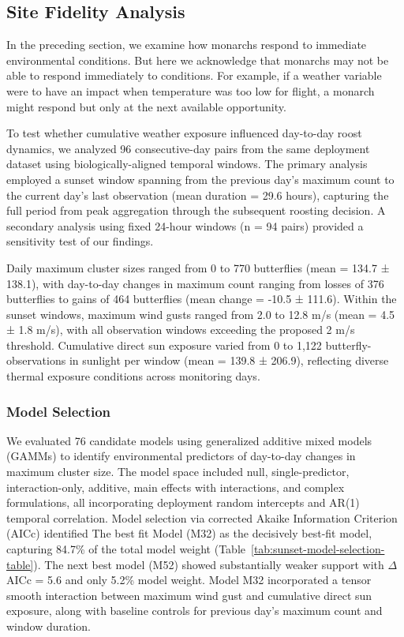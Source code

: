 

\subsection{Site Fidelity Analysis}

In the preceding section, we examine how monarchs respond to immediate environmental conditions. But here we acknowledge that monarchs may not be able to respond immediately to conditions. For example, if a weather variable were to have an impact when temperature was too low for flight, a monarch might respond but only at the next available opportunity.

To test whether cumulative weather exposure influenced day-to-day roost dynamics, we analyzed 96 consecutive-day pairs from the same deployment dataset using biologically-aligned temporal windows. The primary analysis employed a sunset window spanning from the previous day's maximum count to the current day's last observation (mean duration = 29.6 hours), capturing the full period from peak aggregation through the subsequent roosting decision. A secondary analysis using fixed 24-hour windows (n = 94 pairs) provided a sensitivity test of our findings.

Daily maximum cluster sizes ranged from 0 to 770 butterflies (mean = 134.7 ± 138.1), with day-to-day changes in maximum count ranging from losses of 376 butterflies to gains of 464 butterflies (mean change = -10.5 ± 111.6). Within the sunset windows, maximum wind gusts ranged from 2.0 to 12.8 m/s (mean = 4.5 ± 1.8 m/s), with all observation windows exceeding the proposed 2 m/s threshold. Cumulative direct sun exposure varied from 0 to 1,122 butterfly-observations in sunlight per window (mean = 139.8 ± 206.9), reflecting diverse thermal exposure conditions across monitoring days.

\subsubsection{Model Selection}

We evaluated 76 candidate models using generalized additive mixed models (GAMMs) to identify environmental predictors of day-to-day changes in maximum cluster size. The model space included null, single-predictor, interaction-only, additive, main effects with interactions, and complex formulations, all incorporating deployment random intercepts and AR(1) temporal correlation. Model selection via corrected Akaike Information Criterion (AICc) identified The best fit Model (M32) as the decisively best-fit model, capturing 84.7\% of the total model weight (Table~\ref{tab:sunset-model-selection-table}). The next best model (M52) showed substantially weaker support with $\Delta$AICc = 5.6 and only 5.2\% model weight. Model M32 incorporated a tensor smooth interaction between maximum wind gust and cumulative direct sun exposure, along with baseline controls for previous day's maximum count and window duration.

